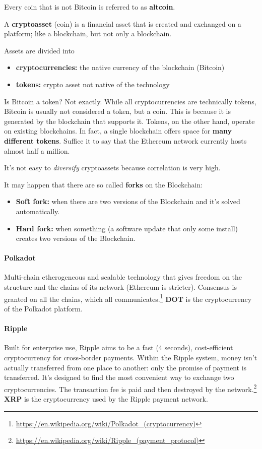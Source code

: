 Every coin that is not Bitcoin is referred to as \textbf{altcoin}.

A \textbf{cryptoasset} (coin) is a financial asset that is created and exchanged on a platform; like a blockchain, but not only a blockchain.

Assets are divided into
\begin{itemize}
    \item \textbf{cryptocurrencies:} the native currency of the blockchain (Bitcoin)
    \item \textbf{tokens:} crypto asset not native of the technology
\end{itemize}

Is Bitcoin a token? Not exactly. While all cryptocurrencies are technically tokens, Bitcoin is usually not considered a token, but a coin. This is because it is generated by the blockchain that supports it. Tokens, on the other hand, operate on existing blockchains. In fact, a single blockchain offers space for \textbf{many different tokens}. Suffice it to say that the Ethereum network currently hosts almost half a million.

It's not easy to \textit{diversify} cryptoassets because correlation is very high.

It may happen that there are so called \textbf{forks} on the Blockchain:
\begin{itemize}
    \item \textbf{Soft fork:} when there are two versions of the Blockchain and it's solved automatically.
    \item \textbf{Hard fork:} when something (a software update that only some install) creates two versions of the Blockchain.
\end{itemize}

\paragraph{Polkadot} Multi-chain etherogeneous and scalable technology that gives freedom on the structure and the chains of its network (Ethereum is stricter). Consensus is granted on all the chains, which all communicates.\footnote{\url{https://en.wikipedia.org/wiki/Polkadot_(cryptocurrency)}}
\textbf{DOT} is the cryptocurrency of the Polkadot platform.

\paragraph{Ripple} Built for enterprise use, Ripple aims to be a fast (4 seconds), cost-efficient cryptocurrency for cross-border payments. Within the Ripple system, money isn't actually transferred from one place to another: only the promise of payment is transferred.
It's designed to find the most convenient way to exchange two cryptocurrencies. The transaction fee is paid and then destroyed by the network.\footnote{\url{https://en.wikipedia.org/wiki/Ripple_(payment_protocol)}}
\textbf{XRP} is the cryptocurrency used by the Ripple payment network.


